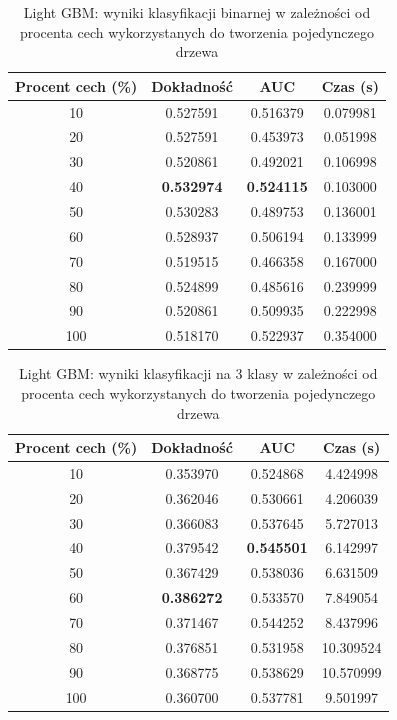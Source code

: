 \documentclass[a4paper, twoside, 11pt, openright]{article}
\begin{document}
\begin{table}[H]
    \centering
    \begin{tabular}{|c|c|c|c|}
    \hline
        \textbf{Procent cech (\%)} & \textbf{Dokładność} & \textbf{AUC} & \textbf{Czas (s)} \\ \hline
10              &  0.527591 &  0.516379 &    0.079981 \\
20              &  0.527591 &  0.453973 &    0.051998 \\
30              &  0.520861 &  0.492021 &    0.106998 \\
40              &  \textbf{0.532974} &  \textbf{0.524115} &    0.103000 \\
50              &  0.530283 &  0.489753 &    0.136001 \\
60              &  0.528937 &  0.506194 &    0.133999 \\
70              &  0.519515 &  0.466358 &    0.167000 \\
80              &  0.524899 &  0.485616 &    0.239999 \\
90              &  0.520861 &  0.509935 &    0.222998 \\
100              &  0.518170 &  0.522937 &    0.354000 \\ \hline
    \end{tabular}
    \caption{Light GBM: wyniki klasyfikacji binarnej w zależności od procenta cech wykorzystanych do tworzenia pojedynczego drzewa}
    \label{tab:lgbm_feature_fraction_binary}
\end{table}

\begin{table}[H]
    \centering
    \begin{tabular}{|c|c|c|c|}
    \hline
        \textbf{Procent cech (\%)} & \textbf{Dokładność} & \textbf{AUC} & \textbf{Czas (s)} \\ \hline
10              &  0.353970 &  0.524868 &    4.424998 \\
20              &  0.362046 &  0.530661 &    4.206039 \\
30              &  0.366083 &  0.537645 &    5.727013 \\
40              &  0.379542 &  \textbf{0.545501} &    6.142997 \\
50              &  0.367429 &  0.538036 &    6.631509 \\
60              &  \textbf{0.386272} &  0.533570 &    7.849054 \\
70              &  0.371467 &  0.544252 &    8.437996 \\
80              &  0.376851 &  0.531958 &   10.309524 \\
90             &  0.368775 &  0.538629 &   10.570999 \\
100              &  0.360700 &  0.537781 &    9.501997 \\ \hline
    \end{tabular}
    \caption{Light GBM: wyniki klasyfikacji na 3 klasy w zależności od procenta cech wykorzystanych do tworzenia pojedynczego drzewa}
    \label{tab:lgbm_feature_fraction_discrete}
\end{table}
\end{document}
